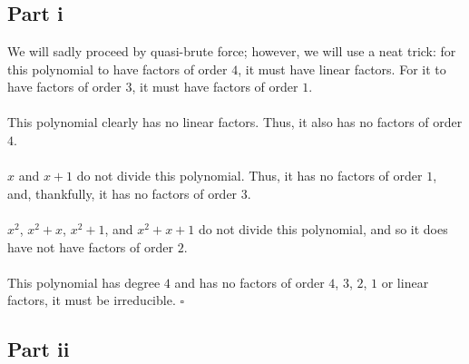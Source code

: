 \documentclass[letterpaper]{article}
\newcommand*{\QED}{\hfill\ensuremath{\square}}%
\begin{document}
\section{}
\label{sec:Question6}

\subsection{Part i}
\label{subs:6Parti}

We will sadly proceed by quasi-brute force; however, we will use a neat trick: for this polynomial to have factors of order $ 4 $, it must have linear factors. For it to have factors of order $ 3 $, it must have factors of order $ 1 $.
\\ \\
This polynomial clearly has no linear factors.
Thus, it also has no factors of order $ 4 $.
\\ \\
$ x $ and $ x + 1 $ do not divide this polynomial.
Thus, it has no factors of order $ 1 $, and, thankfully, it has no factors of order $ 3 $.
\\ \\
$ x^2 $, $ x^2 + x $, $ x^2 + 1 $, and $ x^2 + x + 1 $ do not divide this polynomial, and so it does have not have factors of order $ 2 $.
\\ \\
This polynomial has degree $ 4 $ and has no factors of order $ 4 $, $ 3 $, $ 2 $, $ 1 $ or linear factors, it must be irreducible.
\QED{}

\subsection{Part ii}
\label{subs:6Partii}
\end{document}
